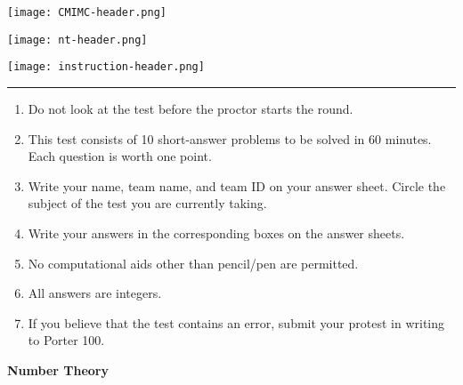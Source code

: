 \documentclass[10pt]{article}
\begin{document}
\thispagestyle{empty}
\begin{center}

\vspace*{90pt}

\texttt{[image: CMIMC-header.png]}

\texttt{[image: nt-header.png]}

\vspace{1.6in}

\texttt{[image: instruction-header.png]}
\noindent\rule{17.7cm}{2pt}
\end{center}

\vspace{10pt}

\begin{enumerate}
\large
\item Do not look at the test before the proctor starts the round.

\item This test consists of 10 short-answer problems to be solved in 60 minutes.
	Each question is worth one point.

\item Write your name, team name, and team ID on your answer sheet. Circle the
	subject of the test you are currently taking.

\item Write your answers in the corresponding boxes on the answer sheets.

\item No computational aids other than pencil/pen are permitted.

\item All answers are integers.

\item If you believe that the test contains an error, submit your protest in writing to Porter 100.
\end{enumerate}

\newpage

\begin{center}
\huge\textbf{Number Theory}\normalsize

\vspace{3pt}
\end{center}
\end{document}
